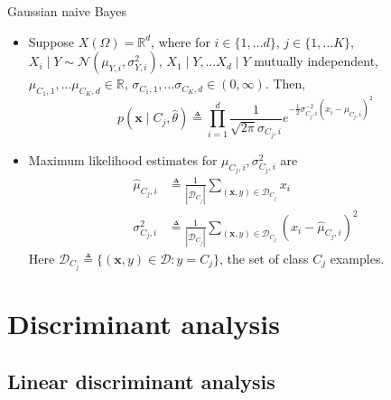 \documentclass{beamer}
\numberwithin{equation}{section}
\begin{document}
\begin{frame}{Gaussian naive Bayes}
    \begin{itemize}
        \item
        Suppose $ X(\Omega) = \mathbb{R}^d $, where for
        $ i \in \{1, \ldots d\} $, $ j \in \{1, \ldots K\} $,
        $ X_i \mid Y \sim \mathcal{N}(\mu_{Y, i}, \sigma_{Y, i}^2) $,
        $ X_1 \mid Y, \ldots X_d \mid Y $ mutually independent,
        $ \mu_{C_1, 1}, \ldots \mu_{C_K, d} \in \mathbb{R} $,
        $ \sigma_{C_1, 1}, \ldots \sigma_{C_K, d} \in (0, \infty) $. Then,
        \begin{equation} \label{normal_nb_like}
            p(\mathbf{x} \mid C_j, \hat{\theta}) \triangleq
            \prod_{i = 1}^d\frac{1}{\sqrt{2\pi}\sigma_{C_j, i}}e^{
                -\frac{1}{2}\sigma_{C_j, i}^{-2}(x_i - \mu_{C_j, i})^2
            }
        \end{equation}

        \item
        Maximum likelihood estimates for $ \mu_{C_j, i}, \sigma_{C_j, i}^2 $
        are
        \begin{equation} \label{normal_nb_param_mle}
            \begin{split}
            \hat{\mu}_{C_j, i} & \triangleq \frac{1}{|\mathcal{D}_{C_j}|}
                \sum_{(\mathbf{x}, y) \in \mathcal{D}_{C_j}}x_i \\
            \sigma_{C_j, i}^2 & \triangleq \frac{1}{|\mathcal{D}_{C_j}|}
                \sum_{(\mathbf{x}, y) \in \mathcal{D}_{C_j}}
                (x_i - \hat{\mu}_{C_j, i})^2
            \end{split}
        \end{equation}
        Here $ \mathcal{D}_{C_j} \triangleq \{(\mathbf{x}, y) \in
        \mathcal{D} : y = C_j\} $, the set of class $ C_j $ examples.
    \end{itemize}
\end{frame}

\section{Discriminant analysis}

\subsection{Linear discriminant analysis}
\end{document}
